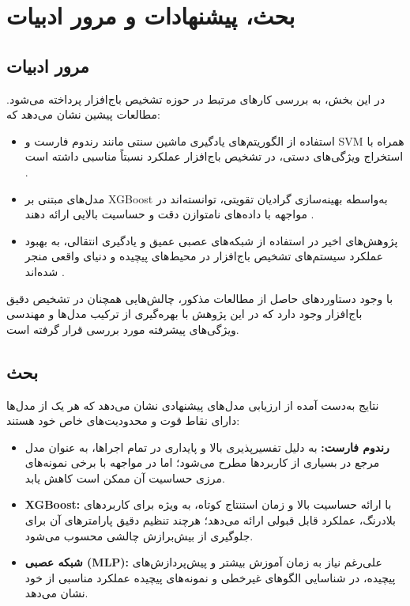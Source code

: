 \chapter{بحث، پیشنهادات و مرور ادبیات}

\section{مرور ادبیات}
در این بخش، به بررسی کارهای مرتبط در حوزه تشخیص باج‌افزار پرداخته می‌شود. مطالعات پیشین نشان می‌دهد که:
\begin{itemize}
    \item استفاده از الگوریتم‌های یادگیری ماشین سنتی مانند رندوم فارست و SVM همراه با استخراج ویژگی‌های دستی، در تشخیص باج‌افزار عملکرد نسبتاً مناسبی داشته است \cite{ref1}.
    \item مدل‌های مبتنی بر XGBoost به‌واسطه بهینه‌سازی گرادیان تقویتی، توانسته‌اند در مواجهه با داده‌های نامتوازن دقت و حساسیت بالایی ارائه دهند \cite{ref2}.
    \item پژوهش‌های اخیر در استفاده از شبکه‌های عصبی عمیق و یادگیری انتقالی، به بهبود عملکرد سیستم‌های تشخیص باج‌افزار در محیط‌های پیچیده و دنیای واقعی منجر شده‌اند \cite{ref3}.
\end{itemize}
با وجود دستاوردهای حاصل از مطالعات مذکور، چالش‌هایی همچنان در تشخیص دقیق باج‌افزار وجود دارد که در این پژوهش با بهره‌گیری از ترکیب مدل‌ها و مهندسی ویژگی‌های پیشرفته مورد بررسی قرار گرفته است.

\section{بحث}
نتایج به‌دست آمده از ارزیابی مدل‌های پیشنهادی نشان می‌دهد که هر یک از مدل‌ها دارای نقاط قوت و محدودیت‌های خاص خود هستند:
\begin{itemize}
    \item \textbf{رندوم فارست:} به دلیل تفسیرپذیری بالا و پایداری در تمام اجراها، به عنوان مدل مرجع در بسیاری از کاربردها مطرح می‌شود؛ اما در مواجهه با برخی نمونه‌های مرزی حساسیت آن ممکن است کاهش یابد.
    \item \textbf{XGBoost:} با ارائه حساسیت بالا و زمان استنتاج کوتاه، به ویژه برای کاربردهای بلادرنگ، عملکرد قابل قبولی ارائه می‌دهد؛ هرچند تنظیم دقیق پارامترهای آن برای جلوگیری از بیش‌برازش چالشی محسوب می‌شود.
    \item \textbf{شبکه عصبی (MLP):} علی‌رغم نیاز به زمان آموزش بیشتر و پیش‌پردازش‌های پیچیده، در شناسایی الگوهای غیرخطی و نمونه‌های پیچیده عملکرد مناسبی از خود نشان می‌دهد.
\end{itemize}

